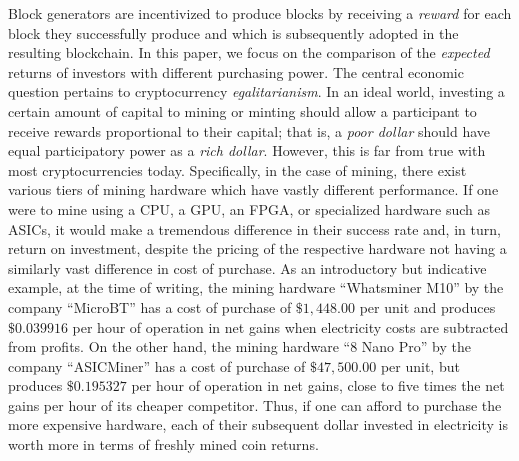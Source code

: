 %
Block generators are
incentivized to produce blocks by receiving a \emph{reward} for each block they
successfully produce and which is subsequently adopted in the resulting
blockchain.
In this paper, we focus on the
comparison of the \emph{expected} returns of investors with different purchasing
power. The central economic question pertains to cryptocurrency \emph{egalitarianism}.
In an ideal world, investing a certain amount of capital to mining or minting
should allow a participant to receive rewards proportional to their capital;
that is, a \emph{poor dollar} should have equal participatory power as a \emph{rich dollar}.
However, this is far from true with most cryptocurrencies today. Specifically, in
the case of mining, there exist various tiers of mining hardware which have
vastly different performance. If one were to mine using a CPU, a GPU, an FPGA,
or specialized hardware such as ASICs, it would make a tremendous difference in
their success rate and, in turn, return on investment, despite the pricing of
the respective hardware not having a similarly vast difference in cost of
purchase. As an introductory but indicative example, at the time of writing, the mining hardware ``Whatsminer
M10'' by the company ``MicroBT'' has a cost of purchase of $\$1,448.00$ per unit and produces $\$0.039916$ per hour
of operation in net gains when electricity costs are subtracted from profits. On
the other hand, the mining hardware ``8 Nano Pro'' by the company ``ASICMiner'' has a cost of purchase of
$\$47,500.00$ per unit, but produces $\$0.195327$ per hour of operation in net gains, close to five times the net gains per hour of its cheaper competitor.
Thus, if one can afford to purchase the more expensive hardware, each of their
subsequent dollar invested in electricity is worth more in terms of freshly mined coin returns.

